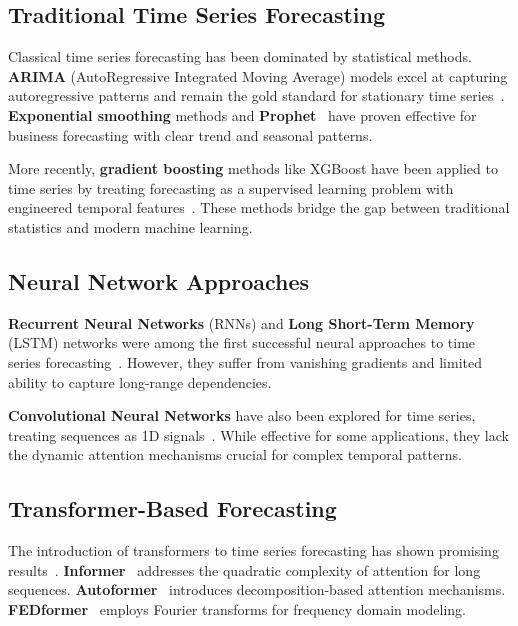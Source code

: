 \documentclass[11pt]{article}
\begin{document}
\subsection{Traditional Time Series Forecasting}

Classical time series forecasting has been dominated by statistical methods. \textbf{ARIMA} (AutoRegressive Integrated Moving Average) models excel at capturing autoregressive patterns and remain the gold standard for stationary time series~\cite{box1976time}. \textbf{Exponential smoothing} methods and \textbf{Prophet}~\cite{taylor2018forecasting} have proven effective for business forecasting with clear trend and seasonal patterns.

More recently, \textbf{gradient boosting} methods like XGBoost have been applied to time series by treating forecasting as a supervised learning problem with engineered temporal features~\cite{chen2016xgboost}. These methods bridge the gap between traditional statistics and modern machine learning.

\subsection{Neural Network Approaches}

\textbf{Recurrent Neural Networks} (RNNs) and \textbf{Long Short-Term Memory} (LSTM) networks were among the first successful neural approaches to time series forecasting~\cite{hochreiter1997long}. However, they suffer from vanishing gradients and limited ability to capture long-range dependencies.

\textbf{Convolutional Neural Networks} have also been explored for time series, treating sequences as 1D signals~\cite{bai2018empirical}. While effective for some applications, they lack the dynamic attention mechanisms crucial for complex temporal patterns.

\subsection{Transformer-Based Forecasting}

The introduction of transformers to time series forecasting has shown promising results~\cite{vaswani2017attention}. \textbf{Informer}~\cite{zhou2021informer} addresses the quadratic complexity of attention for long sequences. \textbf{Autoformer}~\cite{wu2021autoformer} introduces decomposition-based attention mechanisms. \textbf{FEDformer}~\cite{zhou2022fedformer} employs Fourier transforms for frequency domain modeling.
\end{document}
